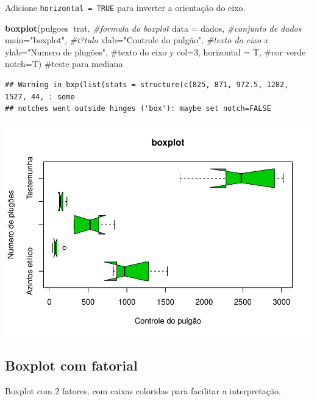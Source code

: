\documentclass[
]{book}
\newenvironment{Shaded}{\begin{snugshade}}{\end{snugshade}}
\newcommand{\CommentTok}[1]{\textcolor[rgb]{0.56,0.35,0.01}{\textit{#1}}}
\newcommand{\DataTypeTok}[1]{\textcolor[rgb]{0.13,0.29,0.53}{#1}}
\newcommand{\KeywordTok}[1]{\textcolor[rgb]{0.13,0.29,0.53}{\textbf{#1}}}
\newcommand{\NormalTok}[1]{#1}
\newcommand{\OperatorTok}[1]{\textcolor[rgb]{0.81,0.36,0.00}{\textbf{#1}}}
\newcommand{\StringTok}[1]{\textcolor[rgb]{0.31,0.60,0.02}{#1}}
\begin{document}
Adicione \texttt{horizontal\ =\ TRUE} para inverter a orientação do eixo.

\begin{Shaded}
\begin{Highlighting}[]
\KeywordTok{boxplot}\NormalTok{(pulgoes}\OperatorTok{~}\NormalTok{trat,              }\CommentTok{#formula do boxplot}
        \DataTypeTok{data =}\NormalTok{ dados,              }\CommentTok{#conjunto de dados}
        \DataTypeTok{main=}\StringTok{"boxplot"}\NormalTok{,            }\CommentTok{#t?tulo}
        \DataTypeTok{xlab=}\StringTok{"Controle do pulgão"}\NormalTok{, }\CommentTok{#texto do eixo x }
        \DataTypeTok{ylab=}\StringTok{"Numero de plugões",  #texto do eixo y}
\StringTok{        col=3, horizontal = T,     #cor verde  }
\StringTok{        notch=T)                   #teste para mediana}
\end{Highlighting}
\end{Shaded}

\begin{verbatim}
## Warning in bxp(list(stats = structure(c(825, 871, 972.5, 1282, 1527, 44, : some
## notches went outside hinges ('box'): maybe set notch=FALSE
\end{verbatim}

\includegraphics{TudodoR_files/figure-latex/unnamed-chunk-172-1.pdf}

\hypertarget{boxplot-com-fatorial}{%
\subsection{Boxplot com fatorial}\label{boxplot-com-fatorial}}

Boxplot com 2 fatores, com caixas coloridas para facilitar a interpretação.
\end{document}

